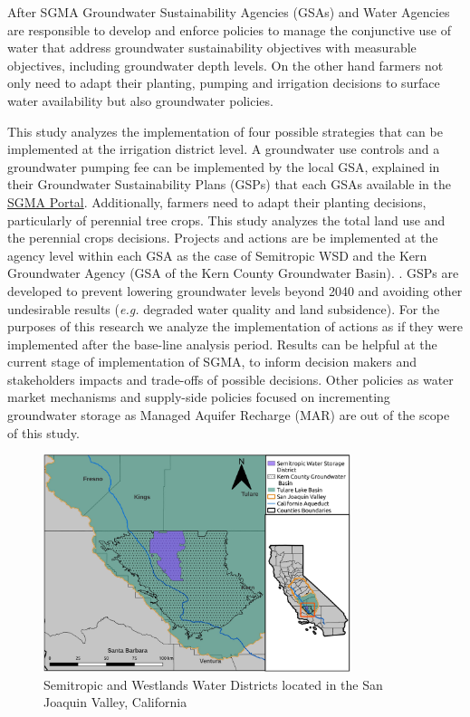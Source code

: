 \documentclass[11pt,a4paper]{article}
\begin{document}
After SGMA Groundwater Sustainability Agencies (GSAs) and Water Agencies are responsible to develop and enforce policies to manage the conjunctive use of water that address groundwater sustainability objectives with measurable objectives, including groundwater depth levels. On the other hand farmers not only need to adapt their planting, pumping and irrigation decisions to surface water availability but also groundwater policies.

This study analyzes the implementation of four possible strategies that can be implemented at the irrigation district level. A groundwater use controls and a groundwater pumping fee can be implemented by the local GSA, explained in their Groundwater Sustainability Plans (GSPs) that each GSAs available in the \hyperlink{https://water.ca.gov/Programs/Groundwater-Management/SGMA-Groundwater-Management/Groundwater-Sustainable-Agencies}{SGMA Portal}. Additionally, farmers need to adapt their planting decisions, particularly of perennial tree crops. This study analyzes the total land use and the perennial crops decisions.  Projects and actions are be implemented at the agency level within each GSA as the case of Semitropic WSD and the Kern Groundwater Agency (GSA of the Kern County Groundwater Basin). . GSPs are developed to prevent lowering groundwater levels beyond 2040 and avoiding other undesirable results (\textit{e.g.} degraded water quality and land subsidence). For the purposes of this research we analyze the implementation of actions as if they were implemented after the base-line analysis period. Results can be helpful at the current stage of implementation of SGMA, to inform decision makers and stakeholders impacts and trade-offs of possible decisions. Other policies as water market mechanisms and supply-side policies focused on incrementing groundwater storage as Managed Aquifer Recharge (MAR) are out of the scope of this study. 

\begin{figure}[H]
    \centering
    \includegraphics[width=0.8\textwidth]{Map_Semitropic.jpg}
    \caption{Semitropic and Westlands Water Districts located in the San Joaquin Valley, California}
    \label{fig:1}
\end{figure}
\end{document}
